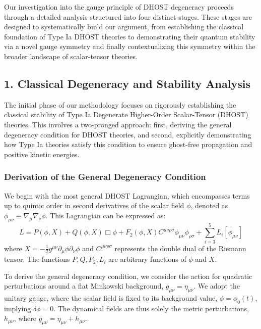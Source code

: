 \documentclass[twocolumn]{aastex631}
\begin{document}
\label{sec:methods}
Our investigation into the gauge principle of DHOST degeneracy proceeds through a detailed analysis structured into four distinct stages. These stages are designed to systematically build our argument, from establishing the classical foundation of Type Ia DHOST theories to demonstrating their quantum stability via a novel gauge symmetry and finally contextualizing this symmetry within the broader landscape of scalar-tensor theories.

\subsection*{1. Classical Degeneracy and Stability Analysis}
The initial phase of our methodology focuses on rigorously establishing the classical stability of Type Ia Degenerate Higher-Order Scalar-Tensor (DHOST) theories. This involves a two-pronged approach: first, deriving the general degeneracy condition for DHOST theories, and second, explicitly demonstrating how Type Ia theories satisfy this condition to ensure ghost-free propagation and positive kinetic energies.

\subsubsection*{Derivation of the General Degeneracy Condition}
We begin with the most general DHOST Lagrangian, which encompasses terms up to quintic order in second derivatives of the scalar field $\phi$, denoted as $\phi_{\mu\nu} \equiv \nabla_\mu \nabla_\nu \phi$. This Lagrangian can be expressed as:
$$L = P(\phi,X) + Q(\phi,X) \Box\phi + F_2(\phi,X) C^{\mu\nu\rho\sigma} \phi_{\mu\nu} \phi_{\rho\sigma} + \sum_{i=3}^{5} L_i[\phi_{\mu\nu}]$$
where $X = -\frac{1}{2} g^{\mu\nu} \partial_\mu \phi \partial_\nu \phi$ and $C^{\mu\nu\rho\sigma}$ represents the double dual of the Riemann tensor. The functions $P, Q, F_2, L_i$ are arbitrary functions of $\phi$ and $X$.

To derive the general degeneracy condition, we consider the action for quadratic perturbations around a flat Minkowski background, $g_{\mu\nu} = \eta_{\mu\nu}$. We adopt the unitary gauge, where the scalar field is fixed to its background value, $\phi = \phi_0(t)$, implying $\delta\phi = 0$. The dynamical fields are thus solely the metric perturbations, $h_{\mu\nu}$, where $g_{\mu\nu} = \eta_{\mu\nu} + h_{\mu\nu}$.
\end{document}
